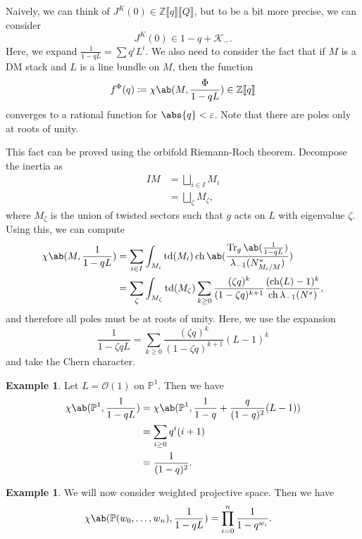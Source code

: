 \documentclass{amsart}
\theoremstyle{definition}
\newtheorem{exm}[thm]{Example}
\theoremstyle{remark}
\theoremstyle{plain}
\theoremstyle{definition}
\theoremstyle{remark}
\newcommand{\Z}{\mathbb{Z}}
\renewcommand{\P}{\mathbb{P}}
\newcommand{\ep}{\varepsilon}
\newcommand{\mc}[1]{\mathcal{#1}}
\newcommand{\on}[1]{\operatorname{#1}}
\newcommand{\1}{\mathbf{1}}
\newcommand{\2}{\mathbf{2}}
\newcommand{\3}{\mathbf{3}}
\newcommand{\ps}[1]{\llbracket #1 \rrbracket}
\DeclareMathOperator{\ch}{ch}
\begin{document}
Naively, we can think of \(J^K(0) \in \Z\ps{q}\ps{Q}\), but to be a bit more precise, we can consider
\[ J^K(0) \in 1-q + \mc{K}_-. \]
Here, we expand \(\frac{1}{1-qL} = \sum q^i L^i\). 
We also need to consider the fact that if \(M\) is a DM stack and \(L\) is a line bundle on \(M\), then the function
\[ f^{\Phi}(q) \coloneqq \chi\ab(M, \frac{\Phi}{1-qL}) \in \Z \ps{q} \]
converges to a rational function for \(\abs{q} < \ep\). Note that there are poles only at roots of unity.

This fact can be proved using the orbifold Riemann-Roch theorem. Decompose the inertia as
\begin{align*}
    IM &= \bigsqcup_{i \in I} M_i \\
    &= \bigsqcup_{\zeta} M_{\zeta},
\end{align*}
where \(M_{\zeta}\) is the union of twisted sectors such that \(g\) acts on \(L\) with eigenvalue \(\zeta\). Using this, we can compute
\begin{align*}
    \chi\ab(M, \frac{1}{1-qL}) &= \sum_{i \in I} \int_{M_i} \on{td}(M_i) \on{ch} \ab(\frac{ \on{Tr}_g \ab(\frac{1}{1-qL}) }{\lambda_{-1}(N_{M_i/M}^*)}) \\
    &= \sum_{\zeta} \int_{M_{\zeta}} \on{td}(M_{\zeta}) \sum_{k \geq 0} \frac{(\zeta q)^k}{(1-\zeta q)^{k+1}} \frac{( \on{ch}(L)-1 )^k}{\ch \lambda_{-1}(N^*)},
\end{align*}
and therefore all poles must be at roots of unity. Here, we use the expansion
\[ \frac{1}{1-\zeta q L} = \sum_{k \geq 0} \frac{(\zeta q)^k}{(1-\zeta q)^{k+1}} (L-1)^k \]
and take the Chern character.

\begin{exm}
    Let \(L = \mc{O}(1)\) on \(\P^1\). Then we have
    \begin{align*}
        \chi\ab(\P^1, \frac{1}{1-qL}) &= \chi\ab(\P^1, \frac{1}{1-q} + \frac{q}{(1-q)^2}(L-1)) \\
        &= \sum_{i \geq 0} q^i (i+1) \\
        &= \frac{1}{(1-q)^2}.
    \end{align*}
\end{exm}

\begin{exm}
    We will now consider weighted projective space. Then we have
    \begin{align*}
        \chi\ab(\P(w_0, \ldots, w_n), \frac{1}{1-qL}) &= \prod_{i=0}^n \frac{1}{1-q^{w_i}}. 
    \end{align*}
\end{exm}
\end{document}
